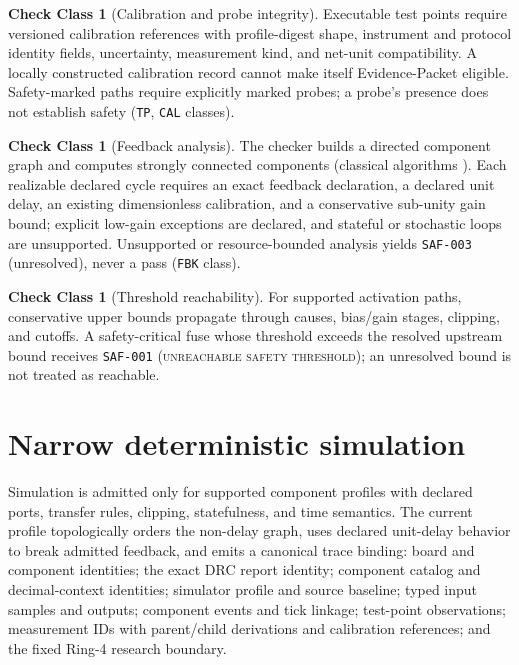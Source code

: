 \documentclass[11pt]{amsart}
\theoremstyle{definition}
\newtheorem{checkclass}[theorem]{Check Class}
\theoremstyle{remark}
\begin{document}
\begin{checkclass}[Calibration and probe integrity]
Executable test points require versioned calibration references with profile-digest shape, instrument and protocol identity fields, uncertainty, measurement kind, and net-unit compatibility. A locally constructed calibration record cannot make itself Evidence-Packet eligible. Safety-marked paths require explicitly marked probes; a probe's presence does not establish safety (\texttt{TP}, \texttt{CAL} classes).
\end{checkclass}

\begin{checkclass}[Feedback analysis]
The checker builds a directed component graph and computes strongly connected components (classical algorithms \cite{tarjan}). Each realizable declared cycle requires an exact feedback declaration, a declared unit delay, an existing dimensionless calibration, and a conservative sub-unity gain bound; explicit low-gain exceptions are declared, and stateful or stochastic loops are unsupported. Unsupported or resource-bounded analysis yields \texttt{SAF-003} (unresolved), never a pass (\texttt{FBK} class).
\end{checkclass}

\begin{checkclass}[Threshold reachability]\label{cc:reach}
For supported activation paths, conservative upper bounds propagate through causes, bias/gain stages, clipping, and cutoffs. A safety-critical fuse whose threshold exceeds the resolved upstream bound receives \texttt{SAF-001} (\textsc{unreachable safety threshold}); an unresolved bound is not treated as reachable.
\end{checkclass}

\section{Narrow deterministic simulation}\label{sec:sim}

Simulation is admitted only for supported component profiles with declared ports, transfer rules, clipping, statefulness, and time semantics. The current profile topologically orders the non-delay graph, uses declared unit-delay behavior to break admitted feedback, and emits a canonical trace binding: board and component identities; the exact DRC report identity; component catalog and decimal-context identities; simulator profile and source baseline; typed input samples and outputs; component events and tick linkage; test-point observations; measurement IDs with parent/child derivations and calibration references; and the fixed Ring-4 research boundary.
\end{document}
